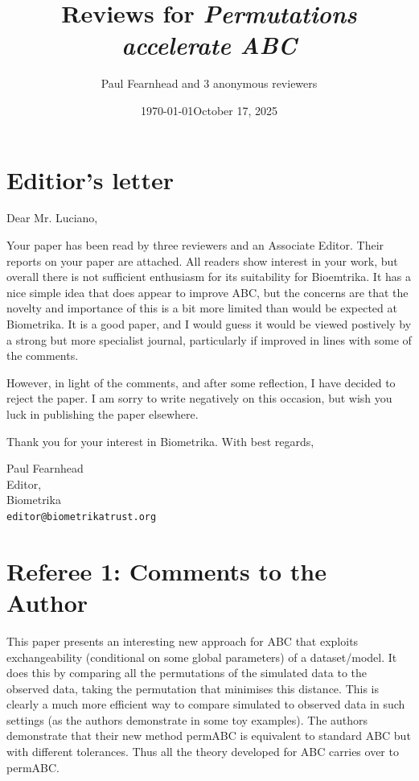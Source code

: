 \documentclass[10.5pt]{article}
\date{\today}
\title{Reviews for \emph{Permutations accelerate ABC}}
\author{Paul Fearnhead and 3 anonymous reviewers}
\date{October 17, 2025}
\begin{document}
\maketitle
\section*{Editior's letter}
Dear Mr. Luciano, 

Your paper has been read by three reviewers and an Associate Editor. Their reports on your paper are attached. All readers show interest in your work, but overall there is not sufficient enthusiasm for its suitability for Bioemtrika. It has a nice simple idea that does appear to improve ABC, but the concerns are that the novelty and importance of this is a bit more limited than would be expected at Biometrika. It is a good paper, and I would guess it would be viewed postively by a strong but more specialist journal, particularly if improved in lines with some of the comments.

However, in light of the comments, and after some reflection, I have decided to reject the paper. I am sorry to write negatively on this occasion, but wish you luck in publishing the paper elsewhere. 

Thank you for your interest in Biometrika. 
With best regards, 

\begin{flushright}
Paul Fearnhead \\
Editor, \\
Biometrika\\ 
\texttt{editor@biometrikatrust.org}
\end{flushright}


\section*{Referee 1: Comments to the Author}

This paper presents an interesting new approach for ABC that exploits exchangeability (conditional on some global parameters) of a dataset/model.  It does this by comparing all the permutations of the simulated data to the observed data, taking the permutation that minimises this distance.  This is clearly a much more efficient way to compare simulated to observed data in such settings (as the authors demonstrate in some toy examples).  The authors demonstrate that their new method permABC is equivalent to standard ABC but with different tolerances.  Thus all the theory developed for ABC carries over to permABC. 
\end{document}
